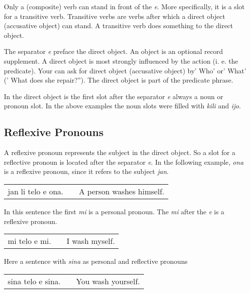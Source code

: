 Only a (composite) verb can stand in front of the \textit{e}. 
More specifically, it is a slot for a transitive verb. 
Transitive verbs are verbs after which a direct object (accusative object) can stand. 
A transitive verb does something to the direct object. 

The separator \textit{e} preface the direct object.
An object is an optional record supplement. 
A direct object is most strongly influenced by the action (i. e. the predicate).
Your can ask for direct object (accusative object) by' Who' or' What' (' What does she repair?'').
The direct object is part of the predicate phrase. 

In the direct object is the first slot after the separator \textit{e} always a noun or pronoun slot.
In the above examples the noun slots were filled with \textit{kili} and \textit{ijo}. 

%
\subsection*{Reflexive Pronouns}

A reflexive pronoun represents the subject in the direct object. 
So a slot for a reflective pronoun is located after the separator \textit{e}. 
In the following example, \textit{ona} is a reflexive pronoun, since it refers to the subject \textit{jan}. 

\begin{supertabular}{p{5,5cm}|ll}
jan li telo e ona. && A person washes himself. \\
\end{supertabular}

In this sentence the first \textit{mi} is a personal pronoun.
The \textit{mi} after the \textit{e} is a reflexive pronoun. 

\begin{supertabular}{p{5,5cm}|ll}
mi telo e mi. && I wash myself. \\
\end{supertabular}

Here a sentence with \textit{sina} as personal and reflective pronouns

\begin{supertabular}{p{5,5cm}|ll}
sina telo e sina. && You wash yourself. \\
\end{supertabular}

